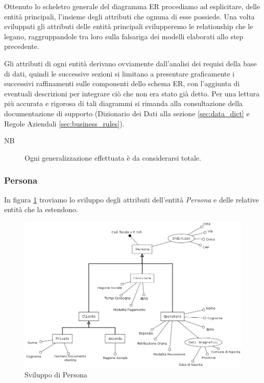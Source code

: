		Ottenuto lo scheletro generale del diagramma ER procediamo ad esplicitare, delle entità principali, l'insieme degli attributi che ognuna di esse possiede.
		Una volta sviluppati gli attributi delle entità principali svilupperemo le relationship che le legano, raggruppandole tra loro sulla falsariga dei modelli elaborati allo step precedente.
		
		Gli attributi di ogni entità derivano ovviamente dall'analisi dei requisi della base di dati, quindi le successive sezioni si limitano a presentare graficamente i successivi raffinamenti sulle componenti dello schema ER, con l'aggiunta di eventuali descrizioni per integrare ciò che non era stato già detto.
		Per una lettura più accurata e rigorosa di tali diagrammi si rimanda alla consultazione della documentazione di supporto (Dizionario dei Dati alla sezione \ref{sec:data_dict} e Regole Aziendali \ref{sec:business_rules}).
		
		\begin{description}
			\item[NB]
				Ogni generalizzazione effettuata è da considerarsi totale.
		\end{description}
		
		\subsubsection{Persona}
		
			In figura \ref{fig:persona} troviamo lo sviluppo degli attributi dell'entità \emph{Persona} e delle relative entità che la estendono.
						
			\begin{figure}[H]
				\centering
				\includegraphics[width=12cm]{images/finitures/persona.png}
				\caption{Sviluppo di Persona}
				\label{fig:persona}
			\end{figure}
			
